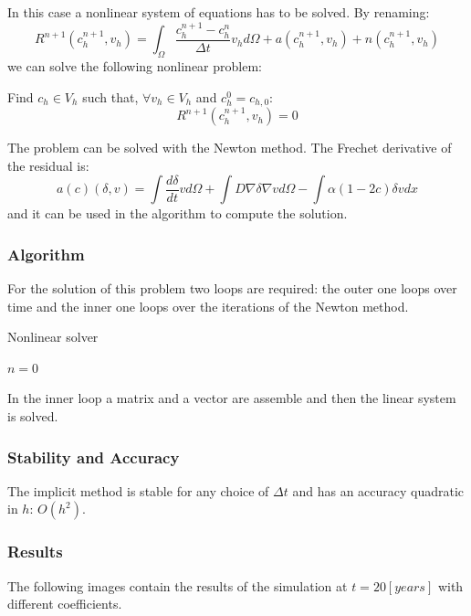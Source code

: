 \documentclass[12pt, letterpaper]{article}
\begin{document}
\noindent In this case a nonlinear system of equations has to be solved. By renaming:
$$
R^{n+1}(c_h^{n+1},v_h)=\int_\Omega\frac{c_h^{n+1}-c_h^n}{\Delta t}v_hd\Omega+a(c_h^{n+1},v_h)+n(c_h^{n+1},v_h)
$$
we can solve the following nonlinear problem:

\noindent Find $c_h\in V_h$ such that, $\forall v_h\in V_h$ and $c_h^0=c_{h,0}$:
$$
R^{n+1}(c_h^{n+1},v_h)=0
$$

\noindent The problem can be solved with the Newton method. The Frechet derivative of the residual is:
$$
a(c)(\delta, v)=\int\frac{d\delta}{dt}vd\Omega+\int D\nabla\delta\nabla vd\Omega-\int\alpha(1-2c)\delta vdx
$$
and it can be used in the algorithm to compute the solution.

\subsubsection{Algorithm}
For the solution of this problem two loops are required: the outer one loops over time and the inner one loops over the iterations of the Newton method.

\begin{algorithm}
    \caption{Nonlinear solver}

    $n = 0$\;
\end{algorithm}
\noindent In the inner loop a matrix and a vector are assemble and then the linear system is solved. 

\subsubsection{Stability and Accuracy}
The implicit method is stable for any choice of $\Delta t$ and has an accuracy quadratic in $h$: $O(h^2)$.

\subsubsection{Results}
The following images contain the results of the simulation at $t=20[years]$ with different coefficients.
\end{document}
